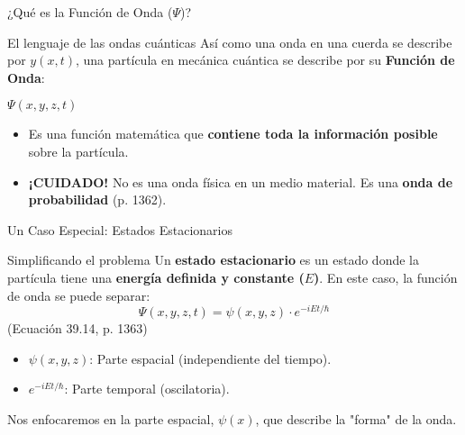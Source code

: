 \documentclass{beamer}
\begin{document}
\begin{frame}{¿Qué es la Función de Onda ($\Psi$)?}
  \begin{block}{El lenguaje de las ondas cuánticas}
    Así como una onda en una cuerda se describe por $y(x, t)$, una partícula en mecánica cuántica se describe por su \textbf{Función de Onda}:
    \begin{center}
      \Huge $\Psi(x, y, z, t)$
    \end{center}
    \begin{itemize}
      \item Es una función matemática que \textbf{contiene toda la información posible} sobre la partícula.
      \item \textbf{¡CUIDADO!} No es una onda física en un medio material. Es una \textbf{onda de probabilidad} (p. 1362).
    \end{itemize}
  \end{block}
\end{frame}

\begin{frame}{Un Caso Especial: Estados Estacionarios}
  \begin{block}{Simplificando el problema}
    Un \textbf{estado estacionario} es un estado donde la partícula tiene una \textbf{energía definida y constante ($E$)}.
    \vspace{0.5em}
    En este caso, la función de onda se puede separar:
    \begin{equation*}
      \Psi(x, y, z, t) = \psi(x, y, z) \cdot e^{-iEt/\hbar}
    \end{equation*}
    \centering (Ecuación 39.14, p. 1363)
    \vspace{0.5em}
    \begin{itemize}
      \item $\psi(x, y, z)$: Parte espacial (independiente del tiempo).
      \item $e^{-iEt/\hbar}$: Parte temporal (oscilatoria).
    \end{itemize}
  \end{block}
  Nos enfocaremos en la parte espacial, $\psi(x)$, que describe la "forma" de la onda.
\end{frame}
\end{document}
